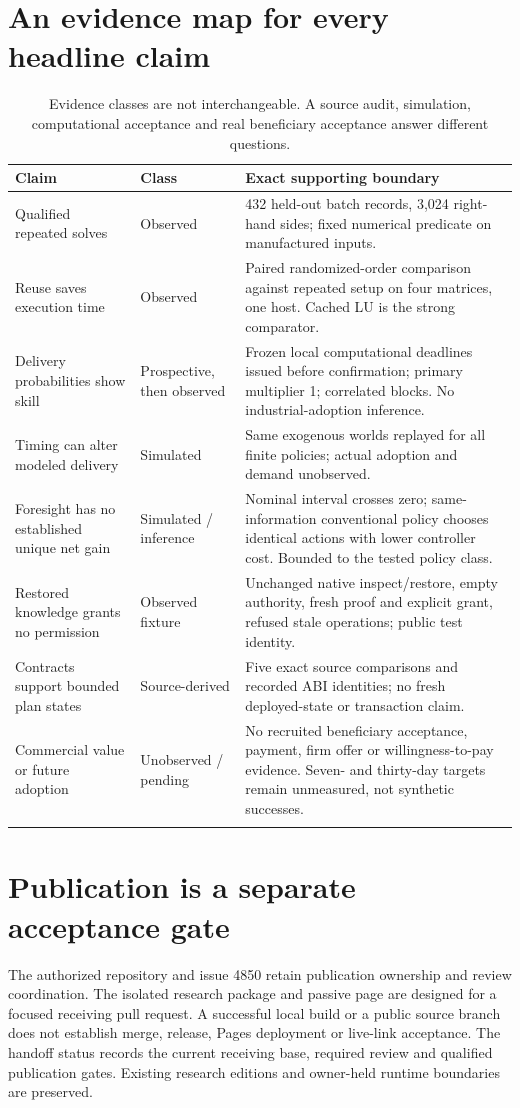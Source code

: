 \FloatBarrier

\FloatBarrier

\section{An evidence map for every headline claim}
\begin{longtable}{@{}L{37mm}L{24mm}L{94mm}@{}}
\toprule Claim & Class & Exact supporting boundary\\\midrule\endhead
Qualified repeated solves & Observed & 432 held-out batch records, 3,024 right-hand sides; fixed numerical predicate on manufactured inputs.\\
Reuse saves execution time & Observed & Paired randomized-order comparison against repeated setup on four matrices, one host. Cached LU is the strong comparator.\\
Delivery probabilities show skill & Prospective, then observed & Frozen local computational deadlines issued before confirmation; primary multiplier 1; correlated blocks. No industrial-adoption inference.\\
Timing can alter modeled delivery & Simulated & Same exogenous worlds replayed for all finite policies; actual adoption and demand unobserved.\\
Foresight has no established unique net gain & Simulated / inference & Nominal interval crosses zero; same-information conventional policy chooses identical actions with lower controller cost. Bounded to the tested policy class.\\
Restored knowledge grants no permission & Observed fixture & Unchanged native inspect/restore, empty authority, fresh proof and explicit grant, refused stale operations; public test identity.\\
Contracts support bounded plan states & Source-derived & Five exact source comparisons and recorded ABI identities; no fresh deployed-state or transaction claim.\\
Commercial value or future adoption & Unobserved / pending & No recruited beneficiary acceptance, payment, firm offer or willingness-to-pay evidence. Seven- and thirty-day targets remain unmeasured, not synthetic successes.\\
\bottomrule
\caption{Evidence classes are not interchangeable. A source audit, simulation, computational acceptance and real beneficiary acceptance answer different questions.}
\end{longtable}

\section{Publication is a separate acceptance gate}
The authorized repository and issue 4850 retain publication ownership and review coordination. The isolated research package and passive page are designed for a focused receiving pull request. A successful local build or a public source branch does not establish merge, release, Pages deployment or live-link acceptance. The handoff status records the current receiving base, required review and qualified publication gates. Existing research editions and owner-held runtime boundaries are preserved.

